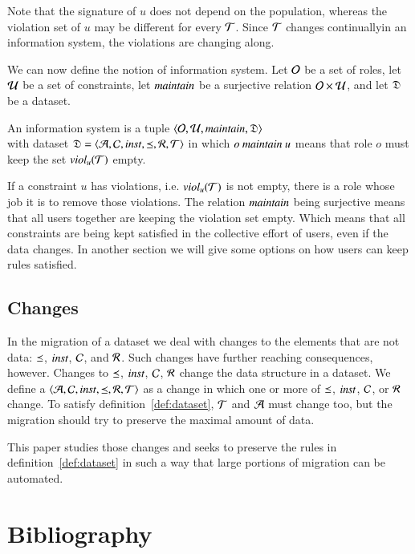 \documentclass{elsarticle}
\begin{document}
	Note that the signature of $u$ does not depend on the population, whereas the violation set of $u$ may be different for every $\mathcal{T}$.
	Since $\mathcal{T}$ changes continuallyin an information system, the violations are changing along. 

	We can now define the notion of information system.
	Let $\mathcal{O}$ be a set of roles,
	let $\mathcal{U}$ be a set of constraints, 
	let $\text{\it maintain\/}$ be a surjective relation $\mathcal{O}\times\mathcal{U}$,
	and let $\mathfrak{D}$ be a dataset.
\begin{definition}
	\label{def:information system}
	\item An information system is a tuple $\langle\mathcal{O},\mathcal{U},\text{\it maintain\/},\mathfrak{D}\rangle$\\
	with dataset $\mathfrak{D}=\langle\mathcal{A},\mathcal{C},\text{\it inst\/},\preceq,\mathcal{R},\mathcal{T}\rangle$
	in which $o\ \text{\it maintain\/}\ u$ means that role $o$ must keep the set $\text{\it viol\/}_{u}(\mathcal{T})$ empty.
\end{definition}
	If a constraint $u$ has violations, i.e. $\text{\it viol\/}_{u}(\mathcal{T})$ is not empty, there is a role whose job it is to remove those violations.
	The relation $\text{\it maintain\/}$ being surjective means that all users together are keeping the violation set empty.
	Which means that all constraints are being kept satisfied in the collective effort of users, even if the data changes.
	In another section we will give some options on how users can keep rules satisfied.

\subsection{Changes}
	In the migration of a dataset we deal with changes to the elements that are not data:
	$\preceq$, $\text{\it inst\/}$, $\mathcal{C}$, and $\mathcal{R}$.
	Such changes have further reaching consequences, however.
	Changes to $\preceq$, $\text{\it inst\/}$, $\mathcal{C}$, $\mathcal{R}$ change the data structure in a dataset.
	We define a  $\langle\mathcal{A},\mathcal{C},\text{\it inst\/},\preceq,\mathcal{R},\mathcal{T}\rangle$ as a change in which one or more of $\preceq$, $\text{\it inst\/}$, $\mathcal{C}$, or $\mathcal{R}$ change.
	To satisfy definition~\ref{def:dataset}, $\mathcal{T}$ and $\mathcal{A}$ must change too,
	but the migration should try to preserve the maximal amount of data.

	This paper studies those changes and seeks to preserve the rules in definition~\ref{def:dataset}
	in such a way that large portions of migration can be automated.


\section{Bibliography}


\end{document}

